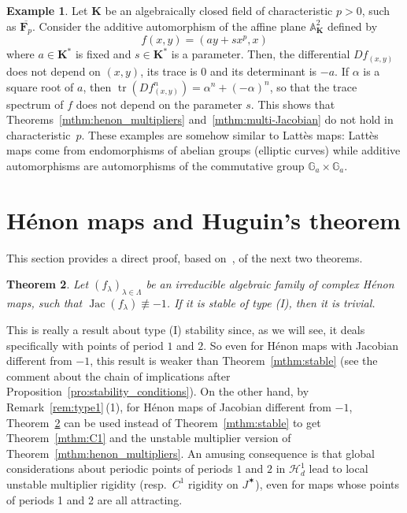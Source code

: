 \documentclass[oneside, 12pt]{amsart}
\newcommand{\jstar}{J^\varstar}
\DeclareMathOperator{\tr}{tr}
\DeclareMathOperator{\jac}{Jac}
\newcommand{\bfK}{{\mathbf{K}}}
\newcommand{\A}{\mathbb{A}}
\theoremstyle{plain}
\newtheorem{thm}{Theorem}[section]
\theoremstyle{definition}
\newtheorem{eg}[thm]{Example}
\numberwithin{equation}{section}       %
\numberwithin{equation}{section}       %
\begin{document}
\begin{eg}
\label{eg:charac_p}
Let $\bfK$ be an algebraically closed field of characteristic $p > 0$, 
such as  $\overline{{\mathbf{F}}_p}$. 
Consider the additive automorphism of the affine plane $\A^2_\bfK$ defined by 
\begin{equation}
f(x,y)=(a y + sx^p, x)
\end{equation}
where $a\in \bfK^*$ is fixed and $s\in \bfK^*$ is a parameter. 
Then, the differential $Df_{(x,y)}$ does not depend on $(x,y)$, 
its trace is $0$ and its determinant is $-a$. If $\alpha$ is a square root of $a$, then $\tr(Df^n_{(x,y)})=\alpha^n+(-\alpha)^n$, 
so that the trace spectrum of $f$ does not depend on the parameter $s$. 
This shows that Theorems~\ref{mthm:henon_multipliers} and~\ref{mthm:multi-Jacobian}
do  not hold in characteristic~$p$. These examples are somehow similar to Lattès maps: Lattès maps come from endomorphisms of
abelian groups (elliptic curves) while additive automorphisms are automorphisms of the commutative group ${\mathbb{G}}_a \times {\mathbb{G}}_a$.
\end{eg}


\section{Hénon maps and Huguin's theorem}\label{sec:huguin}

This section provides a direct proof, based on~\cite[Thm A]{huguin:polynomials}, of the next  two theorems. 
 

\begin{thm}\label{thm:henon_huguin1}
Let  $(f_\lambda)_{\lambda\in \Lambda}$ be an irreducible  algebraic family 
of complex Hénon maps, 
 such that    $\jac(f_\lambda)\not \equiv -1$. If it is stable of type (I), then it  is trivial.
\end{thm}


This is really a result about type (I) stability since, as we will see, it  deals specifically with  points of period $1$ and $2$.  
So even for Hénon maps with  Jacobian different from $ -1$,  this result is weaker than 
Theorem~\ref{mthm:stable}  (see the comment about the chain of implications after Proposition~\ref{pro:stability_conditions}). 
On the other hand, by Remark~\ref{rem:type1}\,(1), for Hénon maps of Jacobian  different from $-1$,  Theorem~\ref{thm:henon_huguin1} can be used  instead of   Theorem~\ref{mthm:stable}   to get  Theorem~\ref{mthm:C1} and the unstable multiplier version of 
   Theorem~\ref{mthm:henon_multipliers}. An amusing consequence is that  global considerations about periodic points of 
   periods $1$ and $2$ in $\mathcal H^1_d$ lead to local unstable multiplier rigidity (resp.\ $C^1$ rigidity  on $\jstar$), 
   even for maps whose points of periods 1 and 2 are all attracting.
   
\end{document}
